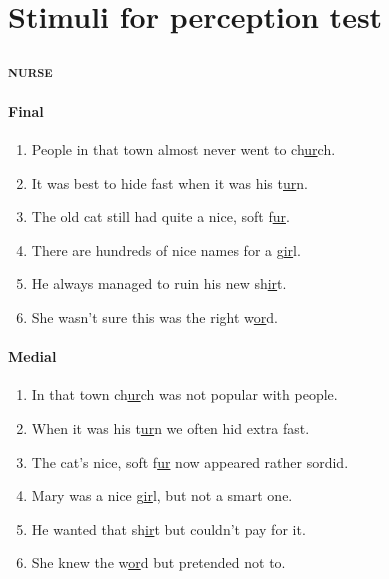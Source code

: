 \chapter{Stimuli for perception test}
	\label{app.stimuli}
	\subsection*{\textsc{nurse}}
	\label{sec:nurse}
	
	\begin{minipage}[t]{0.49\textwidth}
		\subsubsection*{Final}
			\begin{enumerate}\footnotesize
				\item People in that town almost never went to ch\uline{ur}ch.
				\item It was best to hide fast when it was his t\uline{ur}n.
				\item The old cat still had quite a nice, soft f\uline{ur}.
				\item There are hundreds of nice names for a g\uline{ir}l.
				\item He always managed to ruin his new sh\uline{ir}t.
				\item She wasn't sure this was the right w\uline{or}d.
			\end{enumerate}
	\end{minipage}
	\begin{minipage}[t]{0.49\textwidth}
		\subsubsection*{Medial}
			\begin{enumerate}\footnotesize
				\item In that town ch\uline{ur}ch was not popular with people.
				\item When it was his t\uline{ur}n we often hid extra fast.
				\item The cat's nice, soft f\uline{ur} now appeared rather sordid.
				\item Mary was a nice g\uline{ir}l, but not a smart one.
				\item He wanted that sh\uline{ir}t but couldn't pay for it.
				\item She knew the w\uline{or}d but pretended not to.
			\end{enumerate}
	\end{minipage}
			
